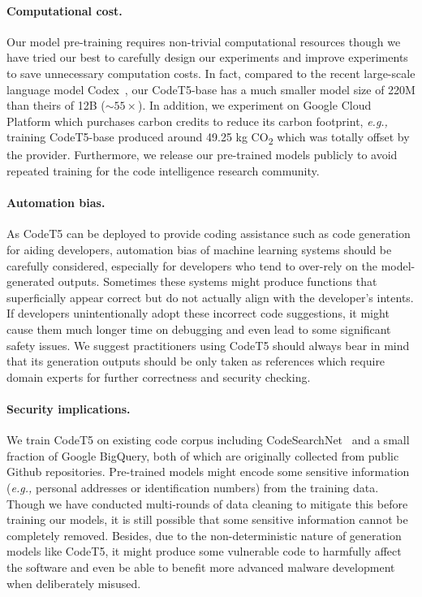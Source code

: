 \documentclass[11pt]{article}
\newcommand{\eg}{{\em e.g.,}\xspace}
\begin{document}
\paragraph{Computational cost.} Our model pre-training requires non-trivial computational resources though we have tried our best to carefully design our experiments and improve experiments to save unnecessary computation costs. In fact, compared to the recent large-scale language model Codex~\cite{DBLP:journals/corr/abs-2107-03374}, our CodeT5-base has a much smaller model size of 220M than theirs of 12B ($\sim55\times$).  In addition, we experiment on Google Cloud Platform which purchases carbon credits to reduce its carbon footprint, \eg training CodeT5-base produced around 49.25 kg CO\textsubscript{2} which was totally offset by the provider.
Furthermore, we release our pre-trained models publicly to avoid repeated training for the code intelligence research community.

\paragraph{Automation bias.} As CodeT5 can be deployed to provide coding assistance such as code generation for aiding developers,  automation bias of machine learning systems should be carefully considered, especially for developers who tend to over-rely on the model-generated outputs. Sometimes these systems might produce functions that superficially appear correct but do not actually align with the developer’s intents. If developers unintentionally adopt these incorrect code suggestions, it might cause them much longer time on debugging and even lead to some significant safety issues. We suggest 
practitioners using CodeT5 should always bear in mind that its generation outputs  should be only taken as references which require domain experts for further correctness and security checking.

\paragraph{Security implications.} 
We train CodeT5 on existing  code corpus including CodeSearchNet~\cite{DBLP:journals/corr/abs-1909-09436} and a small fraction of Google BigQuery, both of which are originally collected from public Github repositories.
Pre-trained models might encode some sensitive information (\eg personal addresses or  identification numbers) from the training data. 
Though we have  conducted multi-rounds of data cleaning to mitigate this before training our models, it is still possible that some sensitive information cannot be completely removed. Besides, due to the non-deterministic nature of generation models like CodeT5, it might produce some vulnerable code to harmfully affect the software and even be able to benefit more advanced malware development when deliberately misused.
\end{document}
